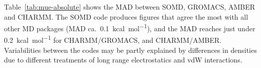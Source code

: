 \documentclass[journal=jctcce,manuscript=article]{achemso}
\begin{document}
\fi

Table~\ref{tab:mue-absolute} shows the MAD between SOMD, GROMACS, AMBER and
CHARMM.  The SOMD code produces figures that agree the most with all other MD packages (MAD ca.\ \SI{0.1}{kcal.mol^{-1}}), and the MAD reaches just under
\SI{0.2}{kcal.mol^{-1}} for CHARMM/GROMACS, and CHARMM/AMBER.  Variabilities between the codes may be partly explained by differences in densities due to different treatments of long range electrostatics and vdW interactions.
\end{document}
